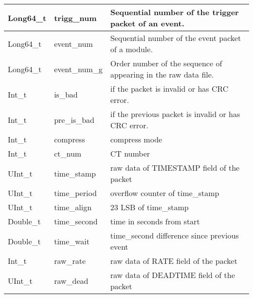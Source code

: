 \documentclass[a4paper, 12pt, onecolumn]{article}
\begin{document}
\begin{center}
  \label{tab:t-modules}    
  \tablelasttail{\hline}
  \begin{supertabular}{| p{28mm} | p{25mm} | p{70mm} |}
    Long64\_t          & trigg\_num          & Sequential number of the trigger packet of an event. \\\hline
    Long64\_t          & event\_num          & Sequential number of the event packet of a module. \\\hline
    Long64\_t          & event\_num\_g       & Order number of the sequence of appearing in the raw data file. \\\hline
    Int\_t             & is\_bad             & if the packet is invalid or has CRC error. \\\hline
    Int\_t             & pre\_is\_bad        & if the previous packet is invalid or has CRC error. \\\hline
    Int\_t             & compress            & compress mode \\\hline
    Int\_t             & ct\_num             & CT number \\\hline
    UInt\_t            & time\_stamp         & raw data of TIMESTAMP field of the packet \\\hline
    UInt\_t            & time\_period        & overflow counter of time\_stamp \\\hline
    UInt\_t            & time\_align         & 23 LSB of time\_stamp  \\\hline
    Double\_t          & time\_second        & time in seconds from start  \\\hline
    Double\_t          & time\_wait          & time\_second difference since previous event \\\hline
    Int\_t             & raw\_rate           & raw data of RATE field of the packet \\\hline
    UInt\_t            & raw\_dead           & raw data of DEADTIME field of the packet \\\hline

\end{supertabular}
\end{center}
\end{document}
